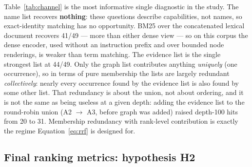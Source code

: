 \documentclass[11pt,a4paper]{article}
\begin{document}
Table~\ref{tab:channel} is the most informative single diagnostic in the study. The name list recovers
\textbf{nothing}: these questions describe capabilities, not names, so exact-identity matching has no
opportunity. BM25 over the concatenated lexical document recovers 41/49 --- more than either dense view ---
so on this corpus the dense encoder, used without an instruction prefix and over bounded node renderings, is
weaker than term matching. The evidence list is the single strongest list at 44/49. Only the graph list
contributes anything \emph{uniquely} (one occurrence), so in terms of pure membership the lists are largely
redundant \emph{collectively}: nearly every occurrence found by the evidence list is also found by some other
list. That redundancy is about the union, not about ordering, and it is not the same as being useless at a
given depth: adding the evidence list to the round-robin union (A2 $\to$ A3, before graph was added) raised
depth-100 hits from 20 to 31. Membership redundancy with rank-level contribution is exactly the regime
Equation~\eqref{eq:rrf} is designed for.

\subsection{Final ranking metrics: hypothesis H2}
\label{sec:final}
\end{document}

